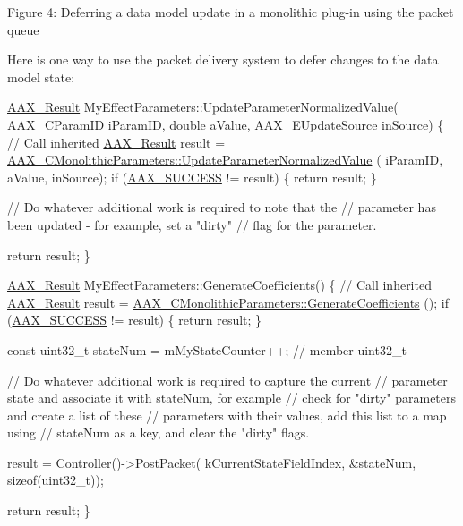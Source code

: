  Figure 4\+: Deferring a data model update in a monolithic plug-\/in using the packet queue

Here is one way to use the packet delivery system to defer changes to the data model state\+: 
\begin{DoxyCode}
\hyperlink{a00149_a4d8f69a697df7f70c3a8e9b8ee130d2f}{AAX\_Result}
MyEffectParameters::UpdateParameterNormalizedValue(
  \hyperlink{a00149_a1440c756fe5cb158b78193b2fc1780d1}{AAX\_CParamID} iParamID,
  \textcolor{keywordtype}{double} aValue,
  \hyperlink{a00206_a30be0398faf20c6b121239eb9399f3f7}{AAX\_EUpdateSource} inSource)
\{
  \textcolor{comment}{// Call inherited}
  \hyperlink{a00149_a4d8f69a697df7f70c3a8e9b8ee130d2f}{AAX\_Result} result = 
      \hyperlink{a00026_a2ebeb6e1cc24277c7e72abbbfbebb5e9}{AAX\_CMonolithicParameters::UpdateParameterNormalizedValue}
      (
    iParamID,
    aValue,
    inSource);
  \textcolor{keywordflow}{if} (\hyperlink{a00207_a5f8c7439f3a706c4f8315a9609811937aeddbd1bb67e3a66e6af54a4b4a7a57b3}{AAX\_SUCCESS} != result) \{ \textcolor{keywordflow}{return} result; \}
  
  \textcolor{comment}{// Do whatever additional work is required to note that the}
  \textcolor{comment}{// parameter has been updated - for example, set a "dirty"}
  \textcolor{comment}{// flag for the parameter.}
  
  \textcolor{keywordflow}{return} result;
\}
\end{DoxyCode}



\begin{DoxyCode}
\hyperlink{a00149_a4d8f69a697df7f70c3a8e9b8ee130d2f}{AAX\_Result}
MyEffectParameters::GenerateCoefficients()
\{
  \textcolor{comment}{// Call inherited}
  \hyperlink{a00149_a4d8f69a697df7f70c3a8e9b8ee130d2f}{AAX\_Result} result = \hyperlink{a00026_ac9a3a7ac90562135ceb4b80301e12e92}{AAX\_CMonolithicParameters::GenerateCoefficients}
      ();
  \textcolor{keywordflow}{if} (\hyperlink{a00207_a5f8c7439f3a706c4f8315a9609811937aeddbd1bb67e3a66e6af54a4b4a7a57b3}{AAX\_SUCCESS} != result) \{ \textcolor{keywordflow}{return} result; \}
  
  \textcolor{keyword}{const} uint32\_t stateNum = mMyStateCounter++; \textcolor{comment}{// member uint32\_t}
  
  \textcolor{comment}{// Do whatever additional work is required to capture the current}
  \textcolor{comment}{// parameter state and associate it with stateNum, for example}
  \textcolor{comment}{// check for "dirty" parameters and create a list of these}
  \textcolor{comment}{// parameters with their values, add this list to a map using}
  \textcolor{comment}{// stateNum as a key, and clear the "dirty" flags.}
  
  result = Controller()->PostPacket(
    kCurrentStateFieldIndex,
    &stateNum,
    \textcolor{keyword}{sizeof}(uint32\_t));
   
  \textcolor{keywordflow}{return} result;
\}
\end{DoxyCode}



